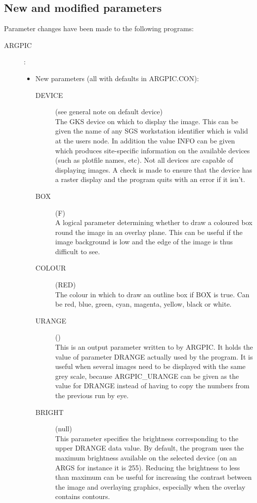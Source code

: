 \subsection{New and modified parameters}
Parameter changes have been made to the following programs:
\begin{description}

\item [ARGPIC]:

\begin{itemize}
\item New parameters (all with defaults in ARGPIC.CON):
\begin{description}
\item [DEVICE](see general note on default device)\\
 The GKS device on which to display the image.
 This can be given the name of any SGS workstation identifier which is valid at
 the users node.
 In addition the value INFO can be given which produces site-specific
 information on the available devices (such as plotfile names, etc).
 Not all devices are capable of displaying images.
 A check is made to ensure that the device has a raster display and the program
 quits with an error if it isn't.
\item [BOX](F)\\
 A logical parameter determining whether to draw a coloured box round the image
 in an overlay plane.
 This can be useful if the image background is low and the edge of the image is
 thus difficult to see.
\item [COLOUR](RED)\\
 The colour in which to draw an outline box if BOX is true.
 Can be red, blue, green, cyan, magenta, yellow, black or white.
\item [URANGE]()\\
 This is an output parameter written to by ARGPIC.
 It holds the value of parameter DRANGE actually used by the program.
 It is useful when several images need to be displayed with the same grey scale,
 because ARGPIC\_URANGE can be given as the value for DRANGE instead of having
 to copy the numbers from the previous run by eye.
\item [BRIGHT](null)\\
 This parameter specifies the brightness corresponding to the upper DRANGE data
 value.
 By default, the program uses the maximum brightness available on the selected
 device (on an ARGS for instance it is 255).
 Reducing the brightness to less than maximum can be useful for increasing the
 contrast between the image and overlaying graphics, especially when the overlay
 contains contours.
\end{description}
\end{itemize}


\end{description}
